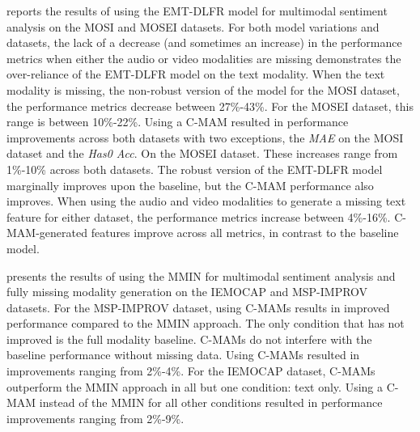  reports the results of using the EMT-DLFR model for multimodal sentiment analysis on the MOSI and MOSEI datasets. For both model variations and datasets, the lack of a decrease (and sometimes an increase) in the performance metrics when either the audio or video modalities are missing demonstrates the over-reliance of the EMT-DLFR model on the text modality. When the text modality is missing, the non-robust version of the model for the MOSI dataset, the performance metrics decrease between 27\%-43\%. For the MOSEI dataset, this range is between 10\%-22\%. Using a C-MAM resulted in performance improvements across both datasets with two exceptions, the \textit{MAE} on the MOSI dataset and the \textit{Has0 Acc}. On the MOSEI dataset. These increases range from 1\%-10\% across both datasets. The robust version of the EMT-DLFR model marginally improves upon the baseline, but the C-MAM performance also improves. When using the audio and video modalities to generate a missing text feature for either dataset, the performance metrics increase between 4\%-16\%. C-MAM-generated features improve across all metrics, in contrast to the baseline model.



 presents the results of using the MMIN for multimodal sentiment analysis and fully missing modality generation on the IEMOCAP and MSP-IMPROV datasets. For the MSP-IMPROV dataset, using C-MAMs results in improved performance compared to the MMIN approach. The only condition that has not improved is the full modality baseline. C-MAMs do not interfere with the baseline performance without missing data. Using C-MAMs resulted in improvements ranging from 2\%-4\%. For the IEMOCAP dataset, C-MAMs outperform the MMIN approach in all but one condition: text only. Using a C-MAM instead of the MMIN for all other conditions resulted in performance improvements ranging from 2\%-9\%.
